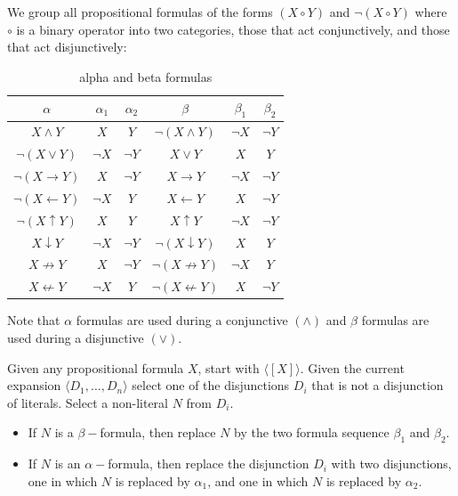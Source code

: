 \documentclass[a4paper]{article}
\theoremstyle{plain}
\newtheorem{thm}{Theorem}[section]
\theoremstyle{definition}
\newtheorem{defn}{Definition}[section]
\theoremstyle{remark}
\begin{document}
\begin{tcolorbox}[colback=black!3!white,colframe=black!60!white,title=\begin{defn}alpha and beta formulas \label{alpha and beta formulas}\end{defn}]
We group all propositional formulas of the forms $\left( X \circ Y \right) $ and $\neg\left( X \circ Y \right) $ where $\circ$ is a binary operator into two categories, those that act conjunctively, and those that act disjunctively:
\begin{table}[H]
	\centering
	\caption{alpha and beta formulas}
	\label{tab:label}
	\begin{tabular}{|c|cc||c|cc|}
		$\alpha$ & $\alpha_1$ & $\alpha_2$ & $\beta$ & $\beta_1$ & $\beta_2$ \\
		\hline
		$X \land Y$ & $X$ & $Y$ & $\neg\left( X \land Y \right) $ & $\neg X$ & $\neg Y$ \\
		$\neg (X \lor Y)$ & $\neg X$ & $\neg Y$ & $X \lor Y$ & $X$ & $Y$ \\
		$\neg \left( X \to Y \right) $ & $X$ & $\neg Y$ & $X \to Y$ & $\neg X$ & $\neg Y$ \\
		$\neg (X \leftarrow Y)$ & $\neg X$ & $Y$ & $X \leftarrow Y$ & $X$ & $\neg Y$ \\
		$\neg (X \uparrow Y)$ & $X$ & $Y$ & $X \uparrow Y$ & $\neg X$ & $\neg Y$ \\
		$X \downarrow Y$ & $\neg X$ & $\neg Y$ & $\neg (X \downarrow Y)$ & $X$ & $Y$ \\
		$X \not\to Y$ & $X$ & $\neg Y$ & $\neg (X \not\to Y)$ & $\neg X$ & $Y$ \\
		$X \not\leftarrow Y$ & $\neg X$ & $Y$ & $\neg (X \not\leftarrow Y)$ & $X$ & $\neg Y$
	\end{tabular}
\end{table}	
Note that $\alpha$ formulas are used during a conjunctive $\left( \land \right) $ and $\beta$ formulas are used during a disjunctive $\left( \lor \right) $. 
\end{tcolorbox}
\begin{tcolorbox}[colback=black!3!white,colframe=black!60!white,title=\begin{thm}Conjunctive Normal Form Algorithm \label{Conjunctive Normal Form Algorithm}\end{thm}]
	Given any propositional formula $X$, start with $\langle [X]\rangle$. Given the current expansion  $\langle D_1,\ldots,D_n \rangle$ select one of the disjunctions $D_i$ that is not a disjunction of literals. Select a non-literal $N$ from $D_i$. 
	\begin{itemize}
		\item If $N$ is a $\beta-$formula, then replace $N$ by the two formula sequence $\beta_1$ and $\beta_2$.
		\item If $N$ is an $\alpha-$formula, then replace the disjunction $D_i$ with two disjunctions, one in which $N$ is replaced by $\alpha_1$, and one in which $N$ is replaced by $\alpha_2$.
	\end{itemize}
\end{tcolorbox}
\end{document}
